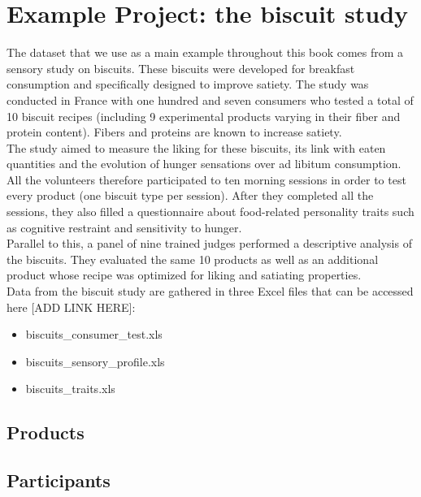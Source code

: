 \documentclass[
]{book}
\providecommand{\tightlist}{%
  \setlength{\itemsep}{0pt}\setlength{\parskip}{0pt}}
\begin{document}
\hypertarget{example-projects}{%
\chapter{Example Project: the biscuit study}\label{example-projects}}

The dataset that we use as a main example throughout this book comes from a sensory study on biscuits. These biscuits were developed for breakfast consumption and specifically designed to improve satiety.
The study was conducted in France with one hundred and seven consumers who tested a total of 10 biscuit recipes (including 9 experimental products varying in their fiber and protein content). Fibers and proteins are known to increase satiety.\\
The study aimed to measure the liking for these biscuits, its link with eaten quantities and the evolution of hunger sensations over ad libitum consumption. All the volunteers therefore participated to ten morning sessions in order to test every product (one biscuit type per session). After they completed all the sessions, they also filled a questionnaire about food-related personality traits such as cognitive restraint and sensitivity to hunger.\\
Parallel to this, a panel of nine trained judges performed a descriptive analysis of the biscuits. They evaluated the same 10 products as well as an additional product whose recipe was optimized for liking and satiating properties.\\
Data from the biscuit study are gathered in three Excel files that can be accessed here {[}ADD LINK HERE{]}:

\begin{itemize}
\tightlist
\item
  biscuits\_consumer\_test.xls\\
\item
  biscuits\_sensory\_profile.xls\\
\item
  biscuits\_traits.xls
\end{itemize}

\hypertarget{products}{%
\section{Products}\label{products}}

\hypertarget{participants}{%
\section{Participants}\label{participants}}
\end{document}
